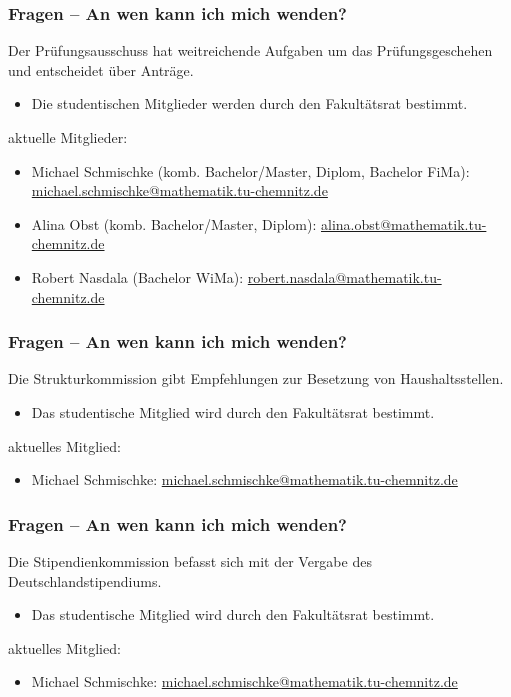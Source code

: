 \begin{frame}
\frametitle{Fragen -- An wen kann ich mich wenden?}
\begin{block}{\vphantom{X}}
	Der Prüfungsausschuss hat weitreichende Aufgaben um das Prüfungsgeschehen und entscheidet über Anträge.
\end{block}
\begin{itemize}
	\item Die studentischen Mitglieder werden durch den Fakultätsrat bestimmt.
\end{itemize}
aktuelle Mitglieder:
\begin{itemize}
	\item Michael Schmischke (komb. Bachelor/Master, Diplom, Bachelor FiMa): \href{mailto:michael.schmischke@mathematik.tu-chemnitz.de}{michael.schmischke@mathematik.tu-chemnitz.de}   
	\item Alina Obst (komb. Bachelor/Master, Diplom): \href{mailto:alina.obst@mathematik.tu-chemnitz.de}{alina.obst@mathematik.tu-chemnitz.de}  
	\item Robert Nasdala (Bachelor WiMa): \href{mailto:robert.nasdala@mathematik.tu-chemnitz.de}{robert.nasdala@mathematik.tu-chemnitz.de}  
\end{itemize}
\end{frame}

\begin{frame}
\frametitle{Fragen -- An wen kann ich mich wenden?}
\begin{block}{\vphantom{X}}
	Die Strukturkommission gibt Empfehlungen zur Besetzung von Haushaltsstellen.
\end{block}
\begin{itemize}
	\item Das studentische Mitglied wird durch den Fakultätsrat bestimmt.
\end{itemize}
aktuelles Mitglied:
\begin{itemize}
	\item Michael Schmischke: \href{mailto:michael.schmischke@mathematik.tu-chemnitz.de}{michael.schmischke@mathematik.tu-chemnitz.de}   
\end{itemize}
\end{frame}

\begin{frame}
\frametitle{Fragen -- An wen kann ich mich wenden?}
\begin{block}{\vphantom{X}}
	Die Stipendienkommission befasst sich mit der Vergabe des Deutschlandstipendiums.
\end{block}
\begin{itemize}
	\item Das studentische Mitglied wird durch den Fakultätsrat bestimmt.
\end{itemize}
aktuelles Mitglied:
\begin{itemize}
	\item Michael Schmischke: \href{mailto:michael.schmischke@mathematik.tu-chemnitz.de}{michael.schmischke@mathematik.tu-chemnitz.de}   
\end{itemize}
\end{frame}

